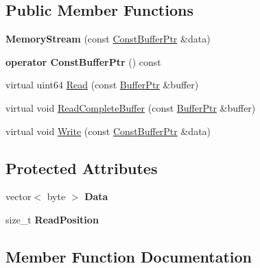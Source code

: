 \subsection*{Public Member Functions}
\begin{DoxyCompactItemize}
\item 
\mbox{\label{class_gost_crypt_1_1_memory_stream_aca2c9d0247f2f4628688312e5b7b9dad}} 
{\bfseries Memory\+Stream} (const \hyperlink{class_gost_crypt_1_1_const_buffer_ptr}{Const\+Buffer\+Ptr} \&data)
\item 
\mbox{\label{class_gost_crypt_1_1_memory_stream_a81ffb032c78c6dd6186d65f931ed4b80}} 
{\bfseries operator Const\+Buffer\+Ptr} () const
\item 
virtual uint64 \hyperlink{class_gost_crypt_1_1_memory_stream_aa20e02242bcd364e8cdfb07a3f764e75}{Read} (const \hyperlink{class_gost_crypt_1_1_buffer_ptr}{Buffer\+Ptr} \&buffer)
\item 
virtual void \hyperlink{class_gost_crypt_1_1_memory_stream_a30c43526f22ef1ab2c46659111044f2a}{Read\+Complete\+Buffer} (const \hyperlink{class_gost_crypt_1_1_buffer_ptr}{Buffer\+Ptr} \&buffer)
\item 
virtual void \hyperlink{class_gost_crypt_1_1_memory_stream_a5dca009f45e062287cae775a0b2e4bff}{Write} (const \hyperlink{class_gost_crypt_1_1_const_buffer_ptr}{Const\+Buffer\+Ptr} \&data)
\end{DoxyCompactItemize}
\subsection*{Protected Attributes}
\begin{DoxyCompactItemize}
\item 
\mbox{\label{class_gost_crypt_1_1_memory_stream_a7e179a42aa04670ca009dfd664dc53e6}} 
vector$<$ byte $>$ {\bfseries Data}
\item 
\mbox{\label{class_gost_crypt_1_1_memory_stream_a7b2df30d431a4255706117c6b0754561}} 
size\+\_\+t {\bfseries Read\+Position}
\end{DoxyCompactItemize}


\subsection{Member Function Documentation}
\mbox{\label{class_gost_crypt_1_1_memory_stream_aa20e02242bcd364e8cdfb07a3f764e75}} 
